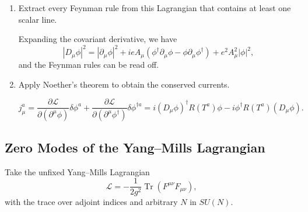 \begin{enumerate}[label=\alph*),resume]
    \item Extract every Feynman rule from this Lagrangian that contains at least
    one scalar line.
    \begin{solution}
        Expanding the covariant derivative, we have
        \begin{equation}
            |D_\mu\phi|^2  = |\partial_\mu\phi|^2 + ieA_\mu(\phi^\dagger\partial_\mu \phi - \phi \partial_\mu \phi^\dagger) + e^2A_\mu^2|\phi|^2,
        \end{equation}
        and the Feynman rules can be read off.
    \end{solution}

    \item Apply Noether's theorem to obtain the conserved currents.
    \begin{solution}
        \begin{equation}
            j^a_\mu = \frac{\partial \mathcal{L}}{\partial(\partial^\mu \phi)}\delta\phi^a  +  \frac{\partial \mathcal{L}}{\partial(\partial^\mu \phi^\dagger)}\delta\phi^{\dagger a}= i (D_\mu\phi)^\dagger R(T^a)\phi - i\phi^\dagger R(T^a)(D_\mu \phi).
        \end{equation}
    \end{solution}
\end{enumerate}

\subsection{Zero Modes of the Yang--Mills Lagrangian}

Take the unfixed Yang--Mills Lagrangian
\begin{equation}
    \mathcal{L}
    =-\frac{1}{2g^2}\operatorname{Tr}(F^{\mu\nu}F_{\mu\nu}),
\end{equation}
with the trace over adjoint indices and arbitrary $N$ in $SU(N)$.

